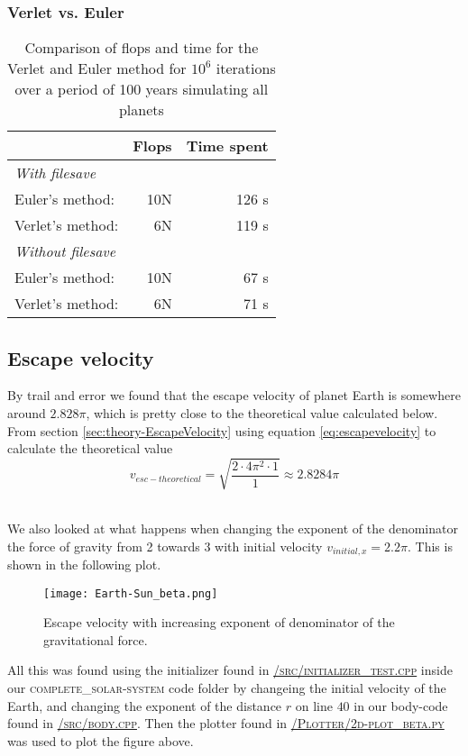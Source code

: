\documentclass[../main.tex]{subfiles}
\begin{document}
\subsubsection{Verlet vs. Euler}\label{sec:Verlet_VS_Euler}
\begin{table}[!h]
  \caption{Comparison of flops and time for the Verlet and Euler method for $10^6$ iterations over a period of 100 years simulating all planets}
  \centering
  \begin{tabular}{l r r}
                            &\textbf{Flops}&\textbf{Time spent}\\
                            \hline
    \textit{With filesave} & & \\
    Euler's method:          &  10N & 126 s\\
    Verlet's method:          & 6N  & 119 s\\
    \hline
    \textit{Without filesave} & & \\
    Euler's method:          &  10N & 67 s\\
    Verlet's method:          & 6N  & 71 s\\
  \end{tabular}
  \label{tab:EulervsVerlet}
  \end{table}
\FloatBarrier

\subsection{Escape velocity} \label{sec:results-esc-vel}
By trail and error we found that the escape velocity of planet Earth is somewhere around $2.828 \pi$, which is pretty close to the theoretical value calculated below.
From section \ref{sec:theory-EscapeVelocity} using equation \eqref{eq:escapevelocity} to calculate the  theoretical value $$v_{esc-theoretical} = \sqrt{\frac{2\cdot4\pi^2\cdot1}{1}} \approx 2.8284 \pi$$\

We also looked at what happens when changing the exponent of the denominator the force of gravity from 2 towards 3 with initial velocity $v_{initial,x} = 2.2\pi$. This is shown in the following plot.

\begin{figure}[h!]
  \centering
  \texttt{[image: Earth-Sun\_beta.png]}
  \caption{Escape velocity with increasing exponent of denominator of the gravitational force.}
  \label{fig:v_esc_beta}
\end{figure}
\FloatBarrier
All this was found using the initializer found in \href{https://github.com/kmaasrud/Project-5/blob/master/code/complete_solar-system/src/initialize_test.cpp}{\textsc{/src/initializer\_test.cpp}} inside our \textsc{complete\_solar-system} code folder by changeing the initial velocity of the Earth, and changing the exponent of the distance $r$ on line $40$ in our body-code found in \href{https://github.com/kmaasrud/Project-5/blob/master/code/complete_solar-system/src/body.cpp}{\textsc{/src/body.cpp}}. Then the plotter found in \href{https://github.com/kmaasrud/Project-5/blob/master/code/Plotter/2d-plot_beta.py}{\textsc{/Plotter/2d-plot\_beta.py}} was used to plot the figure above.
\end{document}
